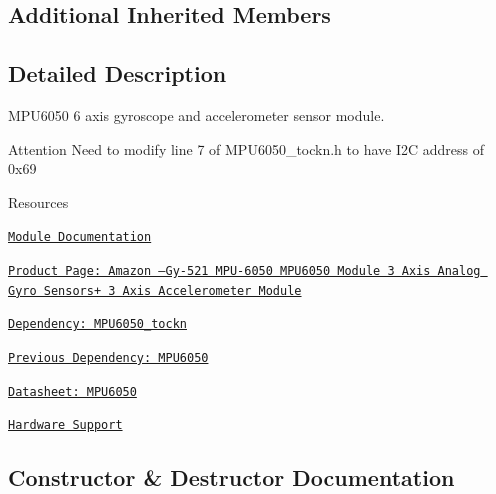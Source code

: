 \subsection*{Additional Inherited Members}


\subsection{Detailed Description}
M\+P\+U6050 6 axis gyroscope and accelerometer sensor module. 

\begin{DoxyAttention}{Attention}
Need to modify line 7 of M\+P\+U6050\+\_\+tockn.\+h to have I2C address of 0x69
\end{DoxyAttention}
\begin{DoxyParagraph}{Resources}

\begin{DoxyItemize}
\item \href{https://openslab-osu.github.io/Loom/html/class_loom___m_p_u6050.html}{\tt Module Documentation}
\item \href{https://www.amazon.com/MPU-6050-MPU6050-Accelerometer-Gyroscope-Converter/dp/B008BOPN40/}{\tt Product Page\+: Amazon –\+Gy-\/521 M\+P\+U-\/6050 M\+P\+U6050 Module 3 Axis Analog Gyro Sensors+ 3 Axis Accelerometer Module}
\item \href{https://github.com/tockn/MPU6050_tockn}{\tt Dependency\+: M\+P\+U6050\+\_\+tockn}
\item \href{https://github.com/jrowberg/i2cdevlib/tree/master/Arduino/MPU6050}{\tt Previous Dependency\+: M\+P\+U6050}
\item \href{https://invensense.tdk.com/wp-content/uploads/2015/02/MPU-6000-Datasheet1.pdf}{\tt Datasheet\+: M\+P\+U6050}
\item \href{https://github.com/OPEnSLab-OSU/Loom/wiki/Hardware-Support#mpu6050-accelerometer--gyroscope}{\tt Hardware Support} 
\end{DoxyItemize}
\end{DoxyParagraph}


\subsection{Constructor \& Destructor Documentation}
